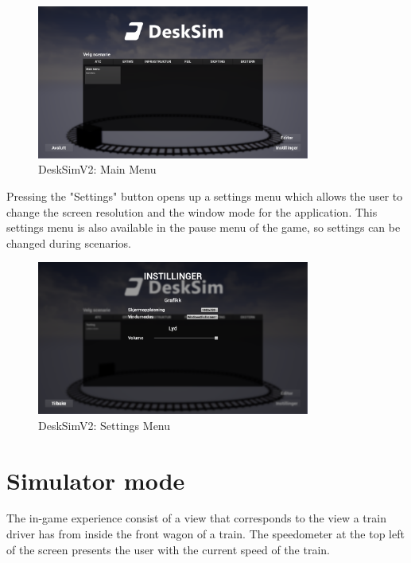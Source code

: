 \begin{figure}[H]
    \centering
    \includegraphics[width=0.8\textwidth]{figures/Main Menu.PNG}
    \vspace{12pt}
    \caption{DeskSimV2: Main Menu}
    \label{Main_Menu_img}
\end{figure} 

Pressing the "Settings" button opens up a settings menu which allows the user to change the screen resolution and the window mode for the application. This settings menu is also available in the pause menu of the game, so settings can be changed during scenarios. 

\begin{figure}[H]
    \centering
    \vspace{12pt}
    \includegraphics[width=0.8\textwidth]{figures/Settings.PNG}
    \caption{DeskSimV2: Settings Menu}
    \label{Settings_img}
\end{figure} 

\section{Simulator mode}

The in-game experience consist of a view that corresponds to the view a train driver has from inside the front wagon of a train. The speedometer at the top left of the screen presents the user with the current speed of the train. 

